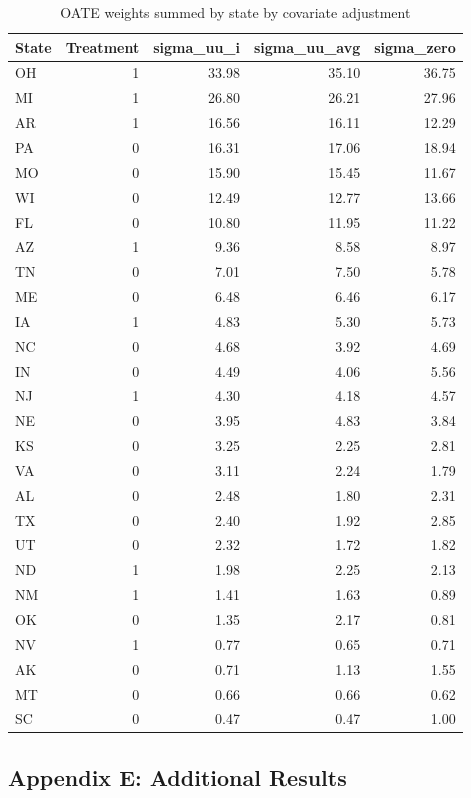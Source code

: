 \documentclass[12pt]{article}
\begin{document}
\begin{table}[ht]
\centering
\begin{tabular}{lrrrr}
  \toprule
State & Treatment & sigma\_uu\_i & sigma\_uu\_avg & sigma\_zero \\ 
  \midrule
OH & 1 & 33.98 & 35.10 & 36.75 \\ 
  MI & 1 & 26.80 & 26.21 & 27.96 \\ 
  AR & 1 & 16.56 & 16.11 & 12.29 \\ 
  PA & 0 & 16.31 & 17.06 & 18.94 \\ 
  MO & 0 & 15.90 & 15.45 & 11.67 \\ 
  WI & 0 & 12.49 & 12.77 & 13.66 \\ 
  FL & 0 & 10.80 & 11.95 & 11.22 \\ 
  AZ & 1 & 9.36 & 8.58 & 8.97 \\ 
  TN & 0 & 7.01 & 7.50 & 5.78 \\ 
  ME & 0 & 6.48 & 6.46 & 6.17 \\ 
  IA & 1 & 4.83 & 5.30 & 5.73 \\ 
  NC & 0 & 4.68 & 3.92 & 4.69 \\ 
  IN & 0 & 4.49 & 4.06 & 5.56 \\ 
  NJ & 1 & 4.30 & 4.18 & 4.57 \\ 
  NE & 0 & 3.95 & 4.83 & 3.84 \\ 
  KS & 0 & 3.25 & 2.25 & 2.81 \\ 
  VA & 0 & 3.11 & 2.24 & 1.79 \\ 
  AL & 0 & 2.48 & 1.80 & 2.31 \\ 
  TX & 0 & 2.40 & 1.92 & 2.85 \\ 
  UT & 0 & 2.32 & 1.72 & 1.82 \\ 
  ND & 1 & 1.98 & 2.25 & 2.13 \\ 
  NM & 1 & 1.41 & 1.63 & 0.89 \\ 
  OK & 0 & 1.35 & 2.17 & 0.81 \\ 
  NV & 1 & 0.77 & 0.65 & 0.71 \\ 
  AK & 0 & 0.71 & 1.13 & 1.55 \\ 
  MT & 0 & 0.66 & 0.66 & 0.62 \\ 
  SC & 0 & 0.47 & 0.47 & 1.00 \\ 
  \bottomrule
\end{tabular}
\caption{OATE weights summed by state by covariate adjustment}
\label{tab:oatestateweights}
\end{table}

\subsection{Appendix E: Additional Results}
\label{ssec:allresults}
\end{document}
